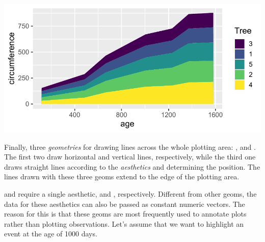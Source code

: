 \documentclass[krantz2]{krantz}\usepackage{knitr}
\begin{document}
\begin{knitrout}\footnotesize
{}\color{fgcolor}\begin{kframe}
\begin{alltt}
\hlstd{(} 
       \hlstd{(}      \hlopt{+}
  \hlstd{(} \hlstd{=} \hlstd{)}
\end{alltt}
\end{kframe}

{\centering \includegraphics[width=.7\textwidth]{figure/pos-area-plot-01-1} 

}



\end{knitrout}

Finally,\label{sec:plot:vhline} three \emph{geometries} for drawing lines across the whole plotting area: ,  and . The first two draw horizontal and vertical lines, respectively, while the third one draws straight lines according to the \emph{aesthetics}  and  determining the position. The lines drawn with these three geoms extend to the edge of the plotting area.

 and  require a single aesthetic,  and , respectively. Different from other geoms, the data for these aesthetics can also be passed as constant numeric vectors. The reason for this is that these geoms are most frequently used to annotate plots rather than plotting observations. Let's assume that we want to highlight an event at the age of 1000 days.
\end{document}
